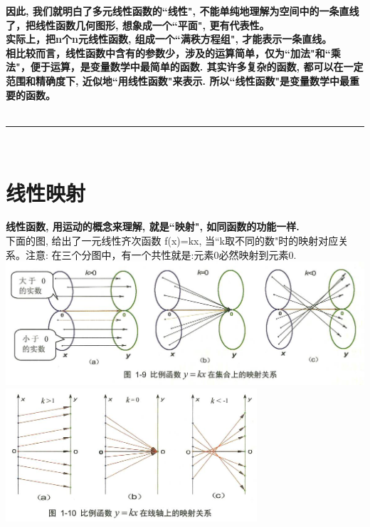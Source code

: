 \documentclass[UTF8]{ctexart}
\begin{document}
\textbf{因此, 我们就明白了多元线性函数的``线性", 不能单纯地理解为空间中的一条直线了，把线性函数几何图形, 想象成一个``平面", 更有代表性。}\\
\textbf{实际上，把n个n元线性函数, 组成一个``满秩方程组", 才能表示一条直线。}\\

\textbf{相比较而言，线性函数中含有的参数少，涉及的运算简单，仅为``加法"和``乘法"，便于运算，是变量数学中最简单的函数. 其实许多复杂的函数, 都可以在一定范围和精确度下, 近似地``用线性函数"来表示. 所以``线性函数"是变量数学中最重要的函数。}\\


~\\
\hrule
~\\



\section{线性映射}

\textbf{线性函数, 用运动的概念来理解, 就是``映射", 如同函数的功能一样.} \\


下面的图, 给出了一元线性齐次函数 f(x)=kx,  当``k取不同的数"时的映射对应关系。注意: 在三个分图中，有一个共性就是:元素0必然映射到元素0. \\

\includegraphics[width=1\textwidth]{img/0116.png} \\

\includegraphics[width=0.7\textwidth]{img/0117.png}\\
\end{document}
